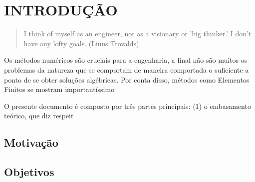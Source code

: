 

\chapter{INTRODUÇÃO}

\begin{quote}
    I think of myself as an engineer, not as a visionary or 'big thinker.' I don't have any lofty goals.
    (Linus Trovalds)  
\end{quote}


Os métodos numéricos são cruciais para a engenharia, a final não são muitos os problemas da natureza que se comportam de maneira comportada o suficiente a ponto de se obter soluções algébricas. Por conta disso, métodos como Elementos Finitos se mostram importantíssimo

O presente documento é composto por três partes principais: (1) o embasamento teórico, que diz respeit

\section{Motivação}

\section{Objetivos}